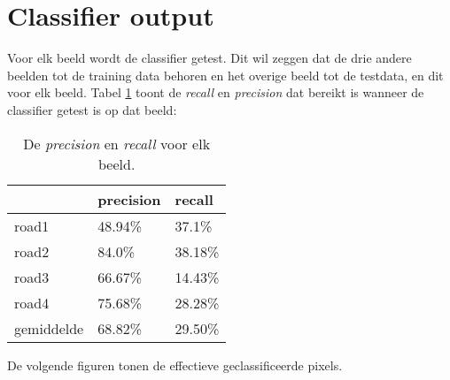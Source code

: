 \documentclass{article}
\begin{document}
\section{Classifier output}
Voor elk beeld wordt de classifier getest. Dit wil zeggen dat de drie andere beelden tot de training data behoren en het overige beeld tot de testdata, en dit voor elk beeld. Tabel \ref{table:precision_recall} toont de \textit{recall} en \textit{precision} dat bereikt is wanneer de classifier getest is op dat beeld:
\begin{table}[ht]
	\centering
	\begin{tabular}{l | l | l}
		& precision & recall \\
		\hline
road1 & 48.94\% & 37.1\% \\
road2 & 84.0\% & 38.18\% \\
road3 & 66.67\% & 14.43\% \\
road4 & 75.68\% & 28.28\% \\
\hline gemiddelde & 68.82\% & 29.50\%
	\end{tabular}
	\caption{De \textit{precision} en \textit{recall} voor elk beeld.}
	\label{table:precision_recall}
\end{table}

\newpage
De volgende figuren tonen de effectieve geclassificeerde pixels.
\end{document}
